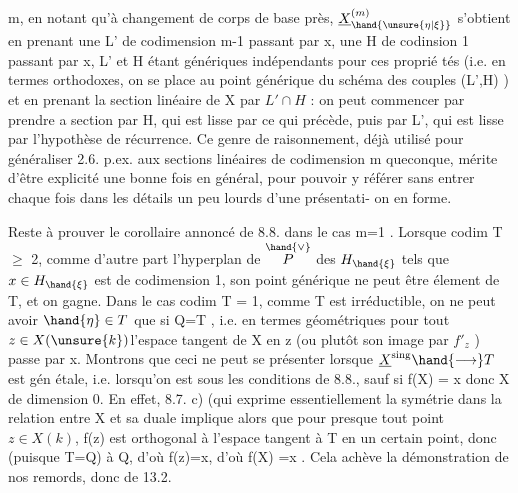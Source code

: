 
\margin{|}m, en notant qu'à changement de corps de base près, $\underline{X}^{(m)}_{\hand{\unsure{\eta|\xi}}}$ s'obtient en
prenant une L' de codimension m-1 passant par x, une H de codinsion
1 passant par x, L' et H étant génériques indépendants pour ces proprié
tés (i.e. en termes orthodoxes, on se place au point générique du 
schéma des couples (L',H)  ) et en prenant la section linéaire
de X par $L'\cap H$ : on peut commencer par prendre a section par H, qui
est lisse par ce qui précède, puis par L', qui est lisse par l'hypothèse
de récurrence. Ce genre de raisonnement, déjà utilisé pour généraliser
2.6. p.ex. aux sections linéaires de codimension m queconque, mérite
d'être explicité une bonne fois en général, pour pouvoir y référer sans
entrer  chaque fois dans les détails un peu lourds d'une présentati-%
on en forme.

Reste à prouver le corollaire annoncé de 8.8. dans le cas m=1 .
Lorsque  codim T $\geqslant$ 2, comme d'autre part l'hyperplan  de $\overset{\hand{\vee}}{P}$ des
$H_{\hand{\xi}}$ tels que $x\in H_{\hand{\xi}}$ est de codimension 1, son point générique \inserted{$\eta$} ne peut
être élement de T, et on gagne. Dans le cas codim T = 1, comme T est
irréductible, on ne peut avoir $\hand{\eta}\in T$ que si Q=T ,
i.e. en termes géométriques   pour tout $z\in X(\unsure{k})$l'espace tangent
de X en z (ou plutôt son image par $f'_{z}$ ) passe par x. Montrons que
ceci ne peut se présenter lorsque $\underline{X}^{\mathrm{sing}}\hand{\longrightarrow}T$ est gén étale, i.e.
lorsqu'on est sous les conditions de 8.8., sauf si f(X) = \hand{\{}x\hand{\}} donc X
de dimension 0. En effet, 8.7. c) (qui exprime essentiellement la
symétrie  dans la relation entre X et sa duale \hand{)} implique alors que
pour presque tout point $z\in X(k)$, f(z) est orthogonal à l'espace tangent
à T en un certain point, donc (puisque T=Q)  à Q, d'où f(z)=x, d'où
f(X) =\hand{\{}x\hand{\}} . Cela achève la démonstration de nos remords, donc de 13.2.

